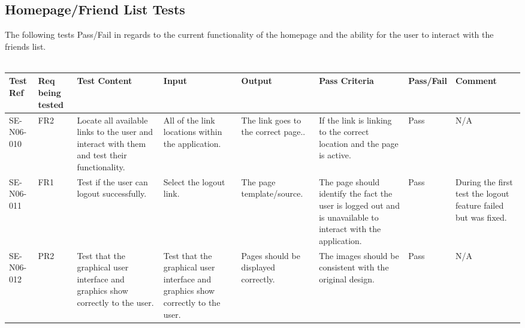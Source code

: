 \documentclass[titlepage]{article}
\begin{document}
{\subsection{Homepage/Friend List Tests} 
The following tests Pass/Fail in regards to the current functionality of the homepage and the ability for the user to interact with the friends list.\\
\\
\begin{sideways}
\centering
\begin{tabular}{|p{1cm}|p{1cm}|p{3cm}|p{3cm}|p{2cm}|p{3cm}|p{2cm}|p{2cm}|}
\hline
Test Ref & Req being tested & Test Content & Input & Output & Pass Criteria & Pass/Fail & Comment \\ 
\hline
SE-N06-010 & FR2 & Locate all available links to the user and interact with them and test their functionality. & All of the link locations within the application. & The link goes to the correct page.. & If the link is linking to the correct  
location and the page is active. & Pass & N/A \\
\hline
SE-N06-011 & FR1 & Test if the user can logout successfully. & Select the logout link. & The page template/source. & The page should identify the fact the user is logged 
out and is unavailable to interact with the application. & Pass & During the first test the logout feature failed but was fixed. \\
\hline
SE-N06-012 & PR2 & Test that the graphical user interface and graphics show correctly to the user. &  
Test that the graphical user interface and graphics show correctly to the user. & Pages should be displayed correctly. & The images should be consistent with the original design. & Pass & N/A\\ 
\hline 
\end{tabular}
\end{sideways}
\newpage
}
\end{document}
